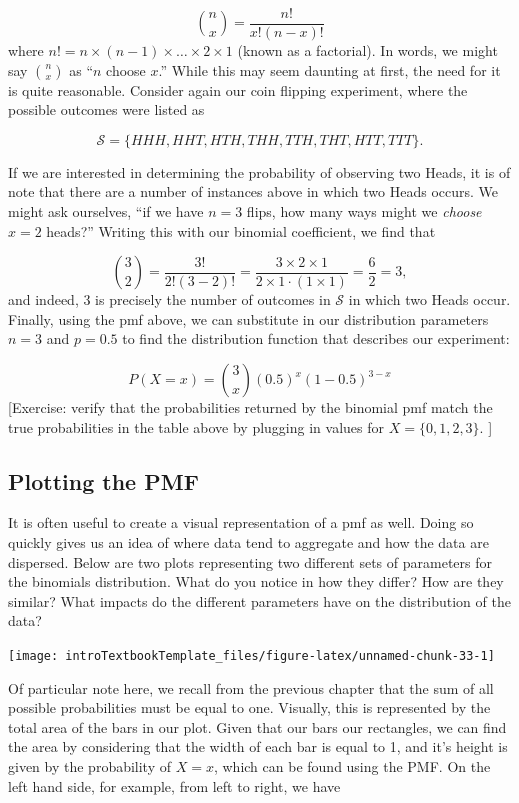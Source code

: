 \documentclass[
]{book}
\theoremstyle{definition}
\theoremstyle{definition}
\theoremstyle{definition}
\theoremstyle{remark}
\begin{document}
\[
\binom{n}{x} = \frac{n!}{x!(n-x)!}
\]
where \(n! = n \times (n-1) \times \dots \times 2 \times 1\) (known as a factorial). In words, we might say \(\binom{n}{x}\) as ``\(n\) choose \(x\).'' While this may seem daunting at first, the need for it is quite reasonable. Consider again our coin flipping experiment, where the possible outcomes were listed as

\[
\mathcal{S} = \{HHH, HHT, HTH, THH, TTH, THT, HTT, TTT\}.
\]

If we are interested in determining the probability of observing two Heads, it is of note that there are a number of instances above in which two Heads occurs. We might ask ourselves, ``if we have \(n = 3\) flips, how many ways might we \emph{choose} \(x = 2\) heads?'' Writing this with our binomial coefficient, we find that

\[
\binom{3}{2} = \frac{3!}{2!(3-2)!} = \frac{3 \times 2 \times 1}{2 \times 1 \cdot(1 \times 1)} = \frac62 = 3,
\]
and indeed, 3 is precisely the number of outcomes in \(\mathcal{S}\) in which two Heads occur. Finally, using the pmf above, we can substitute in our distribution parameters \(n = 3\) and \(p = 0.5\) to find the distribution function that describes our experiment:

\[
P(X = x) = \binom{3}{x} (0.5)^x (1-0.5)^{3-x}
\]
{[}Exercise: verify that the probabilities returned by the binomial pmf match the true probabilities in the table above by plugging in values for \(X = \{0, 1,2,3\}\). {]}

\hypertarget{plotting-the-pmf}{%
\subsection{Plotting the PMF}\label{plotting-the-pmf}}

It is often useful to create a visual representation of a pmf as well. Doing so quickly gives us an idea of where data tend to aggregate and how the data are dispersed. Below are two plots representing two different sets of parameters for the binomials distribution. What do you notice in how they differ? How are they similar? What impacts do the different parameters have on the distribution of the data?

\begin{center}\texttt{[image: introTextbookTemplate\_files/figure-latex/unnamed-chunk-33-1]} \end{center}

Of particular note here, we recall from the previous chapter that the sum of all possible probabilities must be equal to one. Visually, this is represented by the total area of the bars in our plot. Given that our bars our rectangles, we can find the area by considering that the width of each bar is equal to 1, and it's height is given by the probability of \(X = x\), which can be found using the PMF. On the left hand side, for example, from left to right, we have
\end{document}
